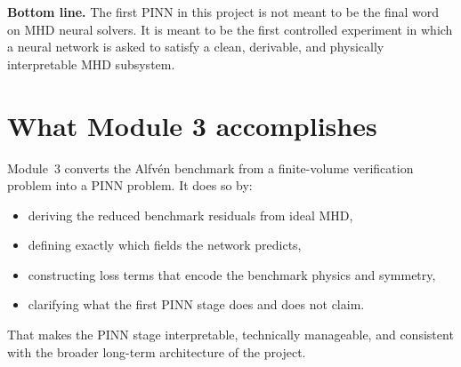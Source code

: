 \documentclass[11pt]{article}
\begin{document}
\begin{physicsbox}
\textbf{Bottom line.} The first PINN in this project is not meant to be the final word on MHD neural solvers. It is meant to be the first controlled experiment in which a neural network is asked to satisfy a clean, derivable, and physically interpretable MHD subsystem.
\end{physicsbox}

\section{What Module 3 accomplishes}
Module~3 converts the Alfv\'en benchmark from a finite-volume verification problem into a PINN problem. It does so by:
\begin{itemize}[leftmargin=1.8em]
    \item deriving the reduced benchmark residuals from ideal MHD,
    \item defining exactly which fields the network predicts,
    \item constructing loss terms that encode the benchmark physics and symmetry,
    \item clarifying what the first PINN stage does and does not claim.
\end{itemize}
That makes the PINN stage interpretable, technically manageable, and consistent with the broader long-term architecture of the project.
\end{document}
